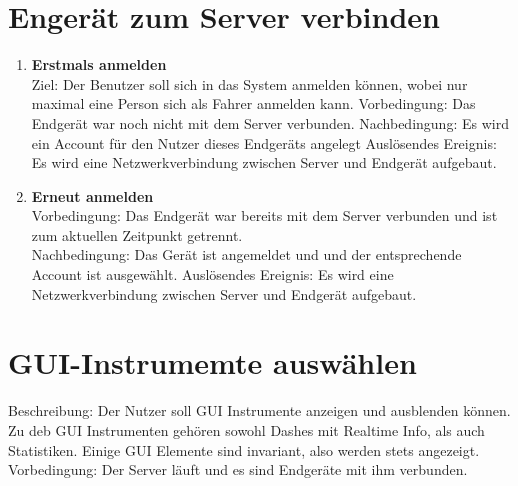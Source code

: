 \documentclass[pflichtenheft.tex]{subfiles}
\begin{document}
\section{Engerät zum Server verbinden}
	\begin{enumerate}	
	\setcounter{enumi}{\value{enumTemp}}
		\item{\textbf{Erstmals anmelden}}\\ Ziel: Der Benutzer soll sich in das System anmelden können, wobei nur maximal eine Person sich als Fahrer anmelden kann.
		Vorbedingung: Das Endgerät war noch nicht mit dem Server verbunden.
		Nachbedingung: Es wird ein Account für den Nutzer dieses Endgeräts angelegt
		Auslösendes Ereignis: Es wird eine Netzwerkverbindung zwischen Server und Endgerät aufgebaut.

		\item{\textbf{Erneut anmelden}}
		\\Vorbedingung: Das Endgerät war bereits mit dem Server verbunden und ist zum aktuellen Zeitpunkt getrennt. \\Nachbedingung: Das Gerät ist angemeldet und und der entsprechende Account ist ausgewählt.
		Auslösendes Ereignis: Es wird eine Netzwerkverbindung zwischen Server und Endgerät aufgebaut.
		\setcounter{enumTemp}{\value{enumi}}
	\end{enumerate}

	
	\section{\textbf{GUI-Instrumemte auswählen}}
	Beschreibung: Der Nutzer soll GUI Instrumente anzeigen und ausblenden können. Zu deb GUI Instrumenten gehören sowohl Dashes mit Realtime Info, als auch Statistiken. Einige GUI Elemente sind invariant, also werden stets angezeigt. \\Vorbedingung: Der Server läuft und es sind Endgeräte mit ihm verbunden.
	
\end{document}

